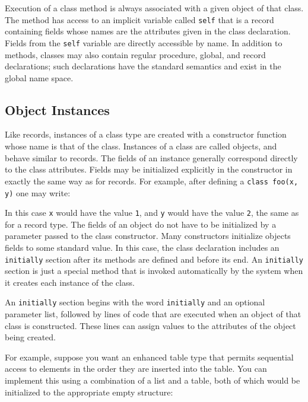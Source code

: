 Execution of a class method is always associated with a given object of
that class. The method has access to an implicit
variable called
\texttt{self} that is a record containing fields whose
names are the attributes given in the class declaration. Fields from
the \texttt{self} variable are directly accessible by name. In addition
to methods, classes may also contain regular procedure, global, and
record declarations; such declarations have the standard semantics and
exist in the global name space. 

\subsection{Object Instances}

Like records, instances of a class type
are created with a constructor function whose
name is that of the class. Instances of a class are called objects, and
behave similar to records. The fields of an instance generally
correspond directly to the class attributes. Fields may be initialized
explicitly in the constructor in exactly the same way as for records.
For example, after defining a \texttt{class foo(x, y)} one may write: 


In this case \texttt{x} would have the value \texttt{1}, and \texttt{y}
would have the value \texttt{2}, the same as for a record
type. The fields of an object do not have to be initialized by a
parameter passed to the class constructor. Many constructors initialize
objects{\textquotesingle} fields to some standard value. In this case,
the class declaration includes an \texttt{initially}
section after its methods are defined and before its end. An
\texttt{initially} section is just a special method that is invoked
automatically by the system when it creates each instance of the class.

An \texttt{initially} section begins with the word
\texttt{initially} and an optional parameter list, followed by lines of
code that are executed when an object of that class is constructed.
These lines can assign values to the attributes of the object
being created.

For example, suppose you want an enhanced table type that permits
sequential access to elements in the order they are inserted into the
table. You can implement this using a combination of a list and a
table, both of which would be initialized to the appropriate empty
structure: 

